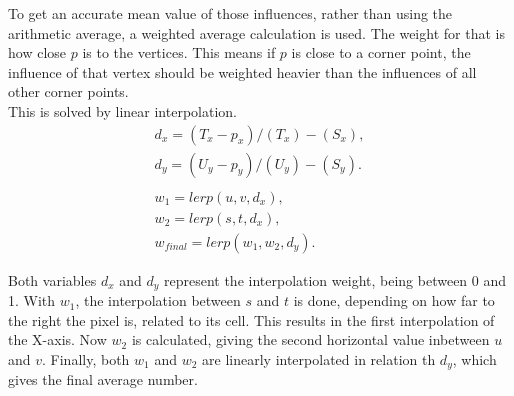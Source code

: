 \noindent
To get an accurate mean value of those influences, rather than using the arithmetic average, a weighted average calculation is used. The weight for that is how close $p$ is to the vertices.
This means if $p$ is close to a corner point, the influence of that vertex should be weighted heavier than the influences of all other corner points.
\\
This is solved by linear interpolation.
$$
\begin{array}{l}
    d_x = (T_x - p_x) / (T_x) - (S_x),\\
    d_y = (U_y - p_y) / (U_y) - (S_y).\\
    \\
    w_1 = lerp(u, v, d_x),\\
    w_2 = lerp(s, t, d_x),\\
    w_{final} = lerp(w_1, w_2, d_y).
\end{array}
$$

\noindent
Both variables $d_x$ and $d_y$ represent the interpolation weight, being between 0 and 1. With $w_1$, the interpolation between $s$ and $t$ is done, depending on how far to the right the pixel is, related to its cell.
This results in the first interpolation of the X-axis. Now $w_2$ is calculated, giving the second horizontal value inbetween $u$ and $v$.
Finally, both $w_1$ and $w_2$ are linearly interpolated in relation th $d_y$, which gives the final average number.



